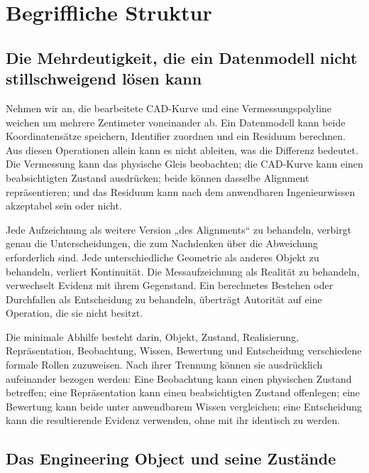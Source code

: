 
\chapter{Begriffliche Struktur}
\label{chap:conceptual-structure}

\section{Die Mehrdeutigkeit, die ein Datenmodell nicht stillschweigend lösen kann}

Nehmen wir an, die bearbeitete CAD-Kurve und eine Vermessungspolyline weichen
um mehrere Zentimeter voneinander ab. Ein Datenmodell kann beide
Koordinatensätze speichern, Identifier zuordnen und ein Residuum berechnen.
Aus diesen Operationen allein kann es nicht ableiten, was die Differenz
bedeutet. Die Vermessung kann das physische Gleis beobachten; die CAD-Kurve
kann einen beabsichtigten Zustand ausdrücken; beide können dasselbe Alignment
repräsentieren; und das Residuum kann nach dem anwendbaren Ingenieurwissen
akzeptabel sein oder nicht.

Jede Aufzeichnung als weitere Version „des Alignments“ zu behandeln, verbirgt
genau die Unterscheidungen, die zum Nachdenken über die Abweichung erforderlich
sind. Jede unterschiedliche Geometrie als anderes Objekt zu behandeln,
verliert Kontinuität. Die Messaufzeichnung als Realität zu behandeln,
verwechselt Evidenz mit ihrem Gegenstand. Ein berechnetes Bestehen oder
Durchfallen als Entscheidung zu behandeln, überträgt Autorität auf eine
Operation, die sie nicht besitzt.

Die minimale Abhilfe besteht darin, Objekt, Zustand, Realisierung,
Repräsentation, Beobachtung, Wissen, Bewertung und Entscheidung verschiedene
formale Rollen zuzuweisen. Nach ihrer Trennung können sie ausdrücklich
aufeinander bezogen werden: Eine Beobachtung kann einen physischen Zustand
betreffen; eine Repräsentation kann einen beabsichtigten Zustand offenlegen;
eine Bewertung kann beide unter anwendbarem Wissen vergleichen; eine
Entscheidung kann die resultierende Evidenz verwenden, ohne mit ihr identisch
zu werden.

\section{Das Engineering Object und seine Zustände}

